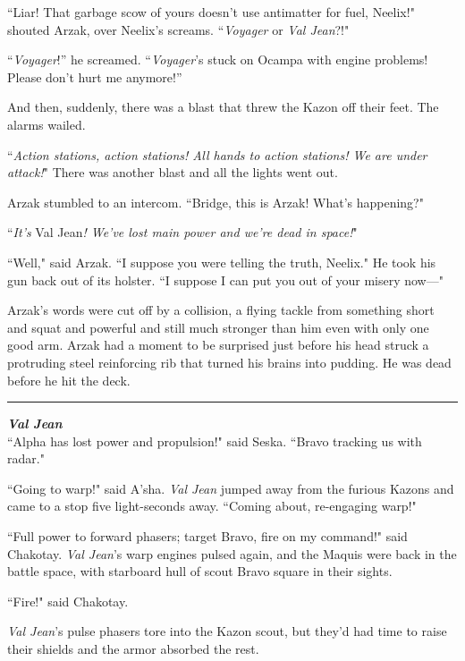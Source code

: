 \documentclass[twoside,letterpaper,12pt]{memoir}
\begin{document}
``Liar! That garbage scow of yours doesn't use antimatter for fuel, Neelix!" shouted Arzak, over Neelix's screams. ``\textit{Voyager} or \textit{Val Jean}?!"

“\textit{Voyager}!” he screamed. “\textit{Voyager}’s stuck on Ocampa with engine problems! Please don’t hurt me anymore!”

And then, suddenly, there was a blast that threw the Kazon off their feet. The alarms wailed.

``\textit{Action stations, action stations! All hands to action stations! We are under attack!}" There was another blast and all the lights went out.

Arzak stumbled to an intercom. ``Bridge, this is Arzak! What's happening?"

``\textit{It's }Val Jean\textit{! We've lost main power and we're dead in space!}"

``Well," said Arzak. ``I suppose you were telling the truth, Neelix." He took his gun back out of its holster. ``I suppose I can put you out of your misery now---"

Arzak's words were cut off by a collision, a flying tackle from something short and squat and powerful and still much stronger than him even with only one good arm. Arzak had a moment to be surprised just before his head struck a protruding steel reinforcing rib that turned his brains into pudding. He was dead before he hit the deck.

\begin{center}\rule{3cm}{0.4 pt}\end{center}

\noindent\textit{\textbf{Val Jean}}\\

``Alpha has lost power and propulsion!" said Seska. ``Bravo tracking us with radar."

``Going to warp!" said A'sha. \textit{Val Jean} jumped away from the furious Kazons and came to a stop five light-seconds away. ``Coming about, re-engaging warp!"

``Full power to forward phasers; target Bravo, fire on my command!" said Chakotay. \textit{Val Jean}'s warp engines pulsed again, and the Maquis were back in the battle space, with starboard hull of scout Bravo square in their sights.

``Fire!" said Chakotay.

\textit{Val Jean}'s pulse phasers tore into the Kazon scout, but they’d had time to raise their shields and the armor absorbed the rest.
\end{document}
